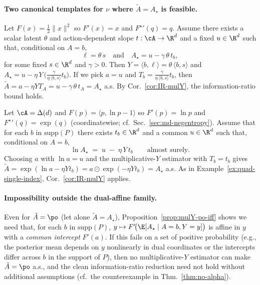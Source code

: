 \paragraph{Two canonical templates for \texorpdfstring{$\nu$}{nu} where \texorpdfstring{$\tilde{A}=A_\star$}{A\_tilde=A\_star} is feasible.}

\begin{example}\label{ex:quad-single-index}
    Let $F(x)=\tfrac12\|x\|^2$ so $F'(x)=x$ and ${F^\star}'(q)=q$.
    Assume there exists a scalar latent $\theta$ and action-dependent slope $t:\cA\to\R^d$
    and a fixed $u\in\R^d$ such that, conditional on $A=b$,
    \[
        \ell = \theta\,s \quad\text{and}\quad
        A_\star = u - \gamma\,\theta\,t_b,
    \]
    for some fixed $s\in\R^d$ and $\gamma>0$.
    Then $Y=\langle b,\ell\rangle=\theta\,\langle b,s\rangle$ and
    \(
    A_\star = u - \eta\,Y\,\Big(\frac{\gamma}{\eta\,\langle b,s\rangle}t_b\Big).
    \)
    If we pick $a=u$ and $T_b=\frac{\gamma}{\eta\,\langle b,s\rangle}t_b$, then
    \(
    \tilde{A}=a-\eta Y T_A = u-\gamma\,\theta\,t_A=A_\star
    \)
    a.s.  By Cor.~\ref{cor:IR-mulY}, the information-ratio bound holds.
\end{example}

\begin{example}\label{ex:negentropy-loglinear}
    Let $\cA=\Delta(d)$ and $F(p)=\langle p,\ln p -1\rangle$ so $F'(p)=\ln p$ and
    ${F^\star}'(q)=\exp(q)$ (coordinatewise; cf.\ Sec.~\ref{sec:md-negentropy}).
    Assume that for each $b$ in $\mathrm{supp}(P)$ there exists $t_b\in\R^d$ and a common
    $u\in\R^d$ such that, conditional on $A=b$,
    \[
        \ln A_\star \;=\; u \;-\;\eta\,Y\,t_b \qquad\text{almost surely.}
    \]
    Choosing $a$ with $\ln a=u$ and the multiplicative-$Y$ estimator with $T_b=t_b$ gives
    \(
    \tilde{A}=\exp(\ln a - \eta Y t_b)=a\odot \exp(-\eta Y t_b)=A_\star
    \)
    a.s.  As in Example~\ref{ex:quad-single-index}, Cor.~\ref{cor:IR-mulY} applies.
\end{example}

\paragraph{Impossibility outside the dual-affine family.}
Even for $\tilde{A}=\po$ (let alone $\tilde{A}=A_\star$), Proposition~\ref{prop:mulY-po-iff}
shows we need that, for each $b$ in $\mathrm{supp}(P)$,
$y\mapsto F'\!\big(\E[A_\star\mid A=b,Y=y]\big)$ is affine in $y$ with a \emph{common intercept}
$F'(a)$. If this fails on a set of positive probability (e.g., the posterior mean depends on $y$
nonlinearly in dual coordinates or the intercepts differ across $b$ in the support of $P$),
then no multiplicative-$Y$ estimator can make $\tilde{A}=\po$ a.s., and the clean
information-ratio reduction need not hold without additional assumptions
(cf.\ the counterexample in Thm.~\ref{thm:no-alpha}).

